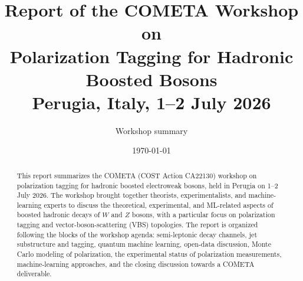 \documentclass[11pt,a4paper]{article}
\title{\textbf{Report of the COMETA Workshop on\\ Polarization Tagging for Hadronic Boosted Bosons}\\[2mm]
\large Perugia, Italy, 1--2 July 2026}
\author{Workshop summary}
\date{\today}
\begin{document}
\maketitle

\begin{abstract}
This report summarizes the COMETA (COST Action CA22130) workshop on polarization
tagging for hadronic boosted electroweak bosons, held in Perugia on 1--2 July
2026. The workshop brought together theorists, experimentalists, and
machine-learning experts to discuss the theoretical, experimental, and
ML-related aspects of boosted hadronic decays of $W$ and $Z$ bosons, with a
particular focus on polarization tagging and vector-boson-scattering (VBS)
topologies. The report is organized following the blocks of the workshop
agenda: semi-leptonic decay channels, jet substructure and tagging, quantum
machine learning, open-data discussion, Monte Carlo modeling of polarization,
the experimental status of polarization measurements, machine-learning
approaches, and the closing discussion towards a COMETA deliverable.
\end{abstract}

\tableofcontents











\end{document}
